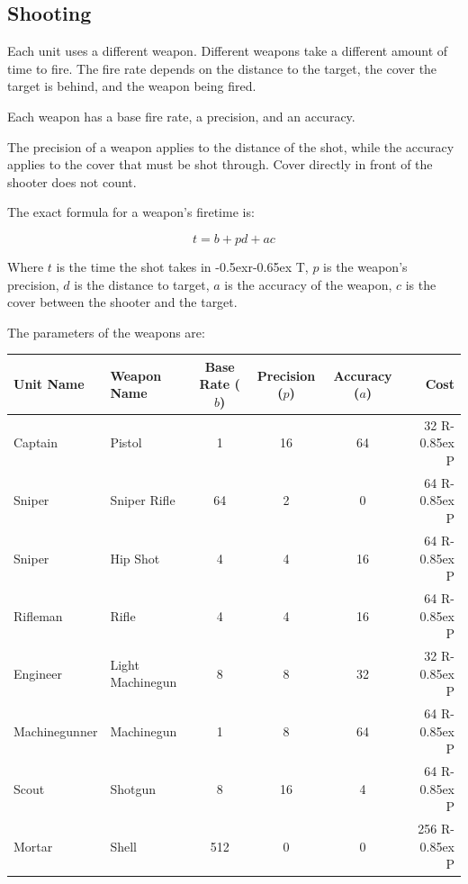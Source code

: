 \documentclass{article}
\newcommand{\RT}{\lower-0.5ex\hbox{r}\kern-0.65ex T}
\newcommand{\RP}{R\kern-0.85ex P}
\begin{document}
\subsection{Shooting}

Each unit uses a different weapon. Different weapons take a different amount of
time to fire. The fire rate depends on the distance to the target, the cover the
target is behind, and the weapon being fired.

Each weapon has a base fire rate, a precision, and an accuracy.

The precision of a weapon applies to the distance of the shot, while the
accuracy applies to the cover that must be shot through. Cover directly in front
of the shooter does not count.

The exact formula for a weapon's firetime is:

$$t=b+pd+ac$$

Where $t$ is the time the shot takes in \RT, $p$ is the weapon's precision, $d$
is the distance to target, $a$ is the accuracy of the weapon, $c$ is the cover
between the shooter and the target.

The parameters of the weapons are:

\begin{minipage}{\textwidth}
\centering
\begin{tabular}{|l|l|c|c|c|r|}
    \hline
        Unit Name &
        Weapon Name &
        Base Rate ($b$) &
        Precision ($p$) &
        Accuracy ($a$) &
        Cost \\ \hline
    Captain & Pistol & 1 & 16 & 64 & 32 \RP \\ \hline
    Sniper & Sniper Rifle & 64 & 2 & 0 & 64 \RP \\ \hline
    Sniper & Hip Shot & 4 & 4 & 16 & 64 \RP \\ \hline
    Rifleman & Rifle & 4 & 4 & 16 & 64 \RP \\ \hline
    Engineer & Light Machinegun & 8 & 8 & 32 & 32 \RP \\ \hline
    Machinegunner & Machinegun & 1 & 8 & 64 & 64 \RP \\ \hline
    Scout & Shotgun & 8 & 16 & 4 & 64 \RP \\ \hline
    Mortar & Shell & 512 & 0 & 0 & 256 \RP \\ \hline
\end{tabular}
\end{minipage}
\end{document}
